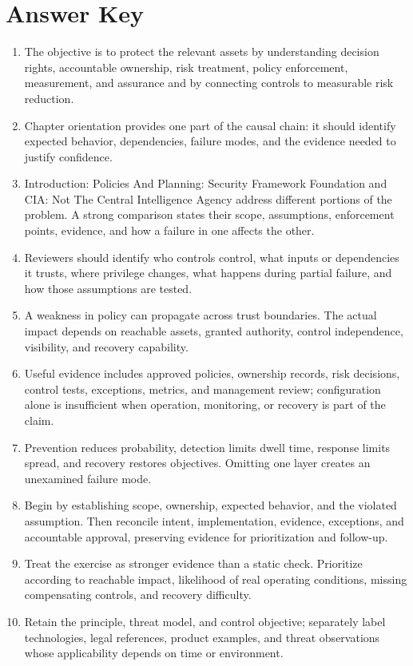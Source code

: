 \documentclass[11pt]{article}
\begin{document}
\section*{Answer Key}
\begin{enumerate}
\item The objective is to protect the relevant assets by understanding decision rights, accountable ownership, risk treatment, policy enforcement, measurement, and assurance and by connecting controls to measurable risk reduction.
\item Chapter orientation provides one part of the causal chain: it should identify expected behavior, dependencies, failure modes, and the evidence needed to justify confidence.
\item Introduction: Policies And Planning: Security Framework Foundation and CIA: Not The Central Intelligence Agency address different portions of the problem. A strong comparison states their scope, assumptions, enforcement points, evidence, and how a failure in one affects the other.
\item Reviewers should identify who controls control, what inputs or dependencies it trusts, where privilege changes, what happens during partial failure, and how those assumptions are tested.
\item A weakness in policy can propagate across trust boundaries. The actual impact depends on reachable assets, granted authority, control independence, visibility, and recovery capability.
\item Useful evidence includes approved policies, ownership records, risk decisions, control tests, exceptions, metrics, and management review; configuration alone is insufficient when operation, monitoring, or recovery is part of the claim.
\item Prevention reduces probability, detection limits dwell time, response limits spread, and recovery restores objectives. Omitting one layer creates an unexamined failure mode.
\item Begin by establishing scope, ownership, expected behavior, and the violated assumption. Then reconcile intent, implementation, evidence, exceptions, and accountable approval, preserving evidence for prioritization and follow-up.
\item Treat the exercise as stronger evidence than a static check. Prioritize according to reachable impact, likelihood of real operating conditions, missing compensating controls, and recovery difficulty.
\item Retain the principle, threat model, and control objective; separately label technologies, legal references, product examples, and threat observations whose applicability depends on time or environment.
\end{enumerate}
\end{document}
